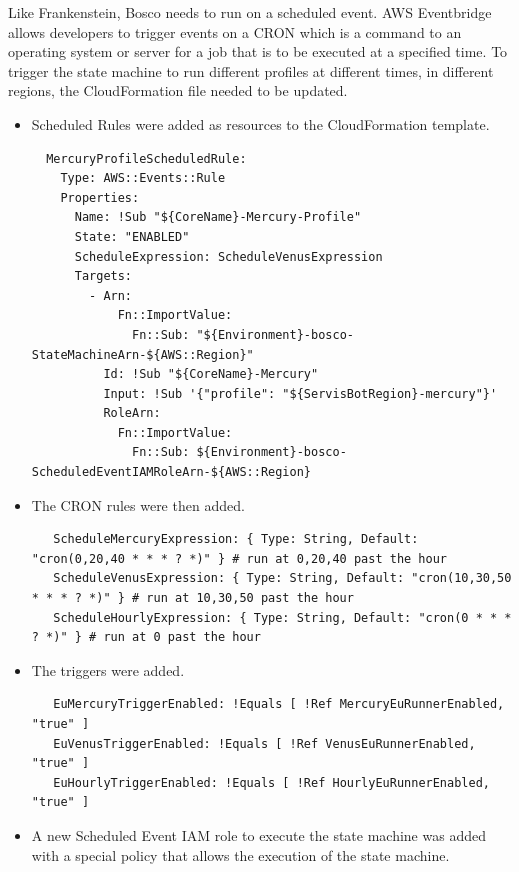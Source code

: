 \documentclass[12pt,a4paper,titlepage]{report}
\begin{document}
Like Frankenstein, Bosco needs to run on a scheduled event. AWS Eventbridge allows developers to trigger events on a CRON which is a command to an operating system or server for a job that is to be executed at a specified time. 
To trigger the state machine to run different profiles at different times, in different regions, the  CloudFormation file needed to be updated. 
\begin{itemize}
 \item Scheduled Rules were added as resources to the CloudFormation template.
 \begin{tcolorbox}
  \begin{verbatim}
  MercuryProfileScheduledRule:
    Type: AWS::Events::Rule
    Properties:
      Name: !Sub "${CoreName}-Mercury-Profile"
      State: "ENABLED"
      ScheduleExpression: ScheduleVenusExpression
      Targets:
        - Arn: 
            Fn::ImportValue: 
              Fn::Sub: "${Environment}-bosco-StateMachineArn-${AWS::Region}"
          Id: !Sub "${CoreName}-Mercury"
          Input: !Sub '{"profile": "${ServisBotRegion}-mercury"}'
          RoleArn: 
            Fn::ImportValue:
              Fn::Sub: ${Environment}-bosco-ScheduledEventIAMRoleArn-${AWS::Region}
  \end{verbatim}
 \end{tcolorbox}
 \item The CRON rules were then added.
  \begin{tcolorbox}
   \begin{verbatim}
   ScheduleMercuryExpression: { Type: String, Default: "cron(0,20,40 * * * ? *)" } # run at 0,20,40 past the hour
   ScheduleVenusExpression: { Type: String, Default: "cron(10,30,50 * * * ? *)" } # run at 10,30,50 past the hour
   ScheduleHourlyExpression: { Type: String, Default: "cron(0 * * * ? *)" } # run at 0 past the hour
   \end{verbatim}
  \end{tcolorbox}

 \item The triggers were added.
 \begin{tcolorbox}
  \begin{verbatim}
   EuMercuryTriggerEnabled: !Equals [ !Ref MercuryEuRunnerEnabled, "true" ]
   EuVenusTriggerEnabled: !Equals [ !Ref VenusEuRunnerEnabled, "true" ]
   EuHourlyTriggerEnabled: !Equals [ !Ref HourlyEuRunnerEnabled, "true" ]
  \end{verbatim}
 \end{tcolorbox}
 \item A new Scheduled Event IAM role to execute the state machine was added with a special policy that allows the execution of the state machine. 
 

\end{itemize}
\end{document}
